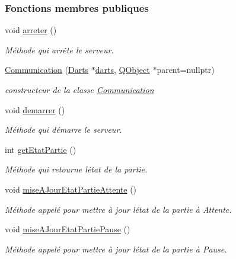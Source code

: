 \subsubsection*{Fonctions membres publiques}
\begin{DoxyCompactItemize}
\item 
void \hyperlink{class_communication_a1f4b02441803f9c8e231cb9f304d776b}{arreter} ()
\begin{DoxyCompactList}\small\item\em Méthode qui arrête le serveur. \end{DoxyCompactList}\item 
\hyperlink{class_communication_a6dd505094f1af1ccd25c6b75c18636d6}{Communication} (\hyperlink{class_darts}{Darts} $\ast$\hyperlink{class_communication_a494d609c206472041468e362d7cfc0e5}{darts}, \hyperlink{class_q_object}{Q\+Object} $\ast$parent=nullptr)
\begin{DoxyCompactList}\small\item\em constructeur de la classe \hyperlink{class_communication}{Communication} \end{DoxyCompactList}\item 
void \hyperlink{class_communication_af29ea9a1c2ce29436f2331c322f6ebbf}{demarrer} ()
\begin{DoxyCompactList}\small\item\em Méthode qui démarre le serveur. \end{DoxyCompactList}\item 
int \hyperlink{class_communication_a977495ad03ddf275aae49184c9a0dd1a}{get\+Etat\+Partie} ()
\begin{DoxyCompactList}\small\item\em Méthode qui retourne l\textquotesingle{}état de la partie. \end{DoxyCompactList}\item 
void \hyperlink{class_communication_a72557be8ab858096e03f08e78e036aeb}{mise\+A\+Jour\+Etat\+Partie\+Attente} ()
\begin{DoxyCompactList}\small\item\em Méthode appelé pour mettre à jour l\textquotesingle{}état de la partie à Attente. \end{DoxyCompactList}\item 
void \hyperlink{class_communication_aaf8fbed545d460414fda14f23d5dca5d}{mise\+A\+Jour\+Etat\+Partie\+Pause} ()
\begin{DoxyCompactList}\small\item\em Méthode appelé pour mettre à jour l\textquotesingle{}état de la partie à Pause. \end{DoxyCompactList}\item 

\end{DoxyCompactItemize}
